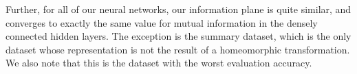 Further, for all of our neural networks, our information plane is quite similar, and converges to exactly the same value for mutual information in the densely connected hidden layers.
The exception is the summary dataset, which is the only dataset whose representation is not the result of a homeomorphic transformation.
We also note that this is the dataset with the worst evaluation accuracy.